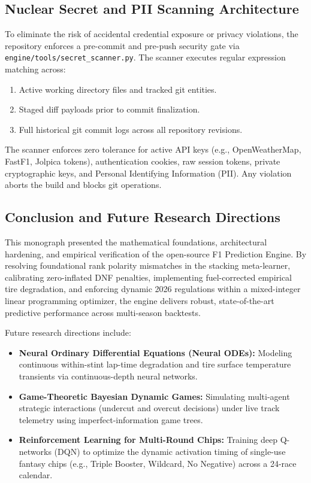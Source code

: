 \subsection{Nuclear Secret and PII Scanning Architecture}
To eliminate the risk of accidental credential exposure or privacy violations, the repository enforces a pre-commit and pre-push security gate via \texttt{engine/tools/secret\_scanner.py}. The scanner executes regular expression matching across:
\begin{enumerate}
    \item Active working directory files and tracked git entities.
    \item Staged diff payloads prior to commit finalization.
    \item Full historical git commit logs across all repository revisions.
\end{enumerate}
The scanner enforces zero tolerance for active API keys (e.g., OpenWeatherMap, FastF1, Jolpica tokens), authentication cookies, raw session tokens, private cryptographic keys, and Personal Identifying Information (PII). Any violation aborts the build and blocks git operations.

\subsection{Conclusion and Future Research Directions}
This monograph presented the mathematical foundations, architectural hardening, and empirical verification of the open-source F1 Prediction Engine. By resolving foundational rank polarity mismatches in the stacking meta-learner, calibrating zero-inflated DNF penalties, implementing fuel-corrected empirical tire degradation, and enforcing dynamic 2026 regulations within a mixed-integer linear programming optimizer, the engine delivers robust, state-of-the-art predictive performance across multi-season backtests.

Future research directions include:
\begin{itemize}
    \item \textbf{Neural Ordinary Differential Equations (Neural ODEs):} Modeling continuous within-stint lap-time degradation and tire surface temperature transients via continuous-depth neural networks.
    \item \textbf{Game-Theoretic Bayesian Dynamic Games:} Simulating multi-agent strategic interactions (undercut and overcut decisions) under live track telemetry using imperfect-information game trees.
    \item \textbf{Reinforcement Learning for Multi-Round Chips:} Training deep Q-networks (DQN) to optimize the dynamic activation timing of single-use fantasy chips (e.g., Triple Booster, Wildcard, No Negative) across a 24-race calendar.
\end{itemize}
